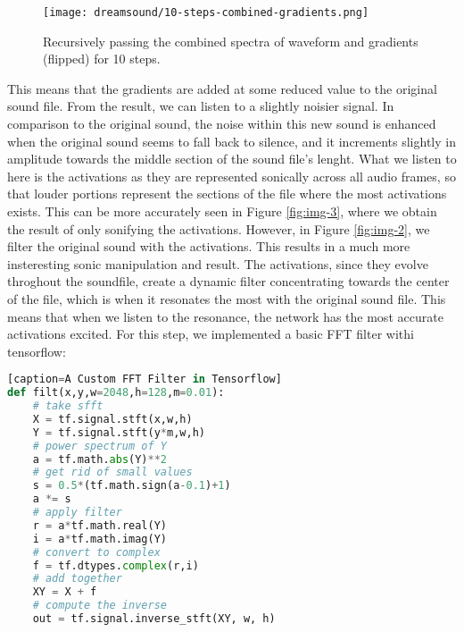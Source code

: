 \documentclass[a4paper,10pt,oneside]{article}
\begin{document}
\begin{sloppy}
\begin{figure*}[htbp]
       \centering
              \texttt{[image: dreamsound/10-steps-combined-gradients.png]}
       \caption{Recursively passing the combined spectra of waveform and gradients (flipped) for 10 steps.}
       \label{fig:img-5}
\end{figure*}

This means that the gradients are added at some reduced value to the original sound file. From the result, we can listen to a slightly noisier signal. In comparison to the original sound, the noise within this new sound is enhanced when the original sound seems to fall back to silence, and it increments slightly in amplitude towards the middle section of the sound file's lenght. What we listen to here is the activations as they are represented sonically across all audio frames, so that louder portions represent the sections of the file where the most activations exists. This can be more accurately seen in Figure \ref{fig:img-3}, where we obtain the result of only sonifying the activations. However, in Figure \ref{fig:img-2}, we filter the original sound with the activations. This results in a much more insteresting sonic manipulation and result. The activations, since they evolve throghout the soundfile, create a dynamic filter concentrating towards the center of the file, which is when it resonates the most with the original sound file. This means that when we listen to the resonance, the network has the most accurate activations excited. For this step, we implemented a basic FFT filter withi tensorflow:

\begin{lstlisting}[language=Python][caption=A Custom FFT Filter in Tensorflow]
def filt(x,y,w=2048,h=128,m=0.01):
    # take sfft
    X = tf.signal.stft(x,w,h)
    Y = tf.signal.stft(y*m,w,h)
    # power spectrum of Y
    a = tf.math.abs(Y)**2
    # get rid of small values
    s = 0.5*(tf.math.sign(a-0.1)+1)
    a *= s 
    # apply filter
    r = a*tf.math.real(Y)
    i = a*tf.math.imag(Y)
    # convert to complex
    f = tf.dtypes.complex(r,i)
    # add together
    XY = X + f
    # compute the inverse
    out = tf.signal.inverse_stft(XY, w, h)
    

\end{lstlisting}
\end{sloppy}
\end{document}
